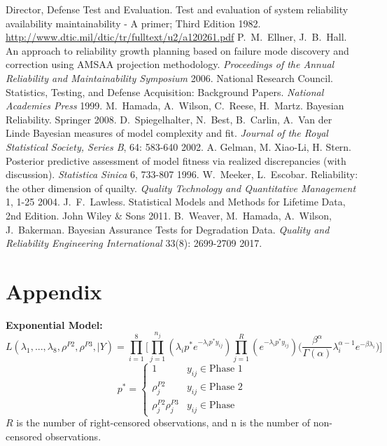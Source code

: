 \documentclass[12pt]{article}
\begin{document}
\begin{thebibliography}{99}
 Director, Defense Test and Evaluation. Test and evaluation of system reliability availability maintainability - A primer; Third Edition 1982. \url{http://www.dtic.mil/dtic/tr/fulltext/u2/a120261.pdf}
 P.\ M.\ Ellner, J.\ B.\ Hall. An approach to reliability
growth planning based on failure mode discovery and correction using AMSAA
projection methodology. \textit{Proceedings of the Annual Reliability and
Maintainability Symposium} 2006.
 National Research Council. Statistics, Testing, and Defense
Acquisition: Background Papers. \textit{National Academies Press} 1999.
 M.\ Hamada, A.\  Wilson, C.\ Reese, H.\ Martz. Bayesian Reliability. Springer 2008.
 D.\  Spiegelhalter, N.\ Best, B.\ Carlin, A.\ Van der
Linde Bayesian measures of model complexity and fit. \textit{Journal of the Royal Statistical
Society, Series B}, 64: 583-640 2002.
 A. Gelman, M. Xiao-Li, H. Stern. Posterior predictive assessment of model fitness via realized discrepancies (with discussion). \textit{Statistica Sinica} 6, 733-807 1996.
 W.\ Meeker, L.\ Escobar. Reliability: the other
dimension of quailty. \textit{Quality Technology and Quantitative Management} 1, 1-25 2004.
 J.\ F.\ Lawless. Statistical Models and Methods for Lifetime Data, 2nd Edition. John Wiley \& Sons 2011.
 B.\ Weaver, M.\ Hamada, A.\ Wilson, J.\ Bakerman. Bayesian Assurance Tests for Degradation Data. \textit{Quality and Reliability Engineering International} 33(8): 2699-2709  2017.
\end{thebibliography}

\section{Appendix}
\textbf{Exponential Model:}
\begin{equation*}
L(\lambda_1, ..., \lambda_8, \rho^{P2}, \rho^{P3}, \vert Y) = \prod_{i = 1}^8
  \Bigg[\prod_{j = 1}^{n_j}(\lambda_i p^*e^{-\lambda_i p^* y_{ij}})\prod_{j =
  1}^R(e^{-\lambda_i p^*
  y_{ij}})\Big(\frac{\beta^\alpha}{\Gamma(\alpha)}\lambda_i^{\alpha -
  1}e^{-\beta\lambda_i}\Big)\Bigg]
\end{equation*}
\[p^* =   \left\{
\begin{array}{ll}
      1 & y_{ij}\in \text{Phase 1} \\
      \rho_{j}^{P2} & y_{ij} \in \text{Phase 2} \\
      \rho_{j}^{P2} \rho_{j}^{P3} & y_{ij} \in \text{Phase }
\end{array}
\right. \]
$R$ is the number of right-censored observations, and n is the number of
non-censored observations.
\end{document}
